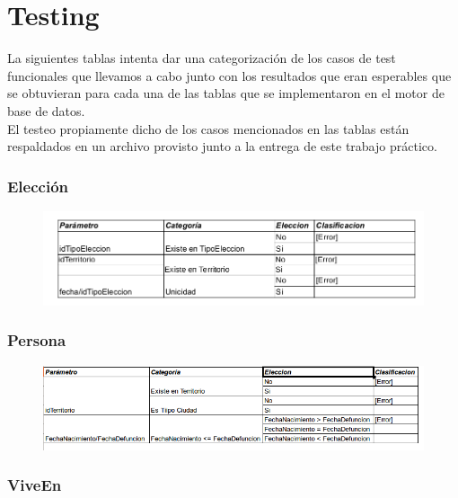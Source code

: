 \section{Testing}

\indent La siguientes tablas intenta dar una categorización de los casos de test funcionales que llevamos a cabo junto con los resultados que eran esperables que se obtuvieran para cada una de las tablas que se implementaron en el motor de base de datos.\\
\indent El testeo propiamente dicho de los casos mencionados en las tablas están respaldados en un archivo provisto junto a la entrega de este trabajo práctico.\\

\subsubsection{Elección}

\begin{figure}[H]
   \begin{center}
   \includegraphics[scale=0.6]{graphics/eleccion.png}
   \label{fig:der}
   \end{center}
\end{figure}


\subsubsection{Persona}

\begin{figure}[H]
   \begin{center}
   \includegraphics[scale=0.7]{graphics/persona.png}
   \label{fig:der}
   \end{center}
\end{figure}

\subsubsection{ViveEn}

